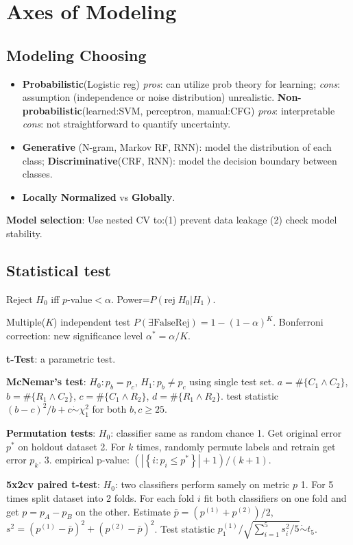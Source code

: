 \section{Axes of Modeling}

\subsection*{Modeling Choosing}

\begin{itemize}[itemsep=0pt,topsep=0pt, leftmargin=2pt, itemindent=5pt, labelwidth=5pt]
    \item \textbf{Probabilistic}(Logistic reg) \textit{pros}: can utilize prob theory for learning; \textit{cons}: assumption (independence or noise distribution) unrealistic. \textbf{Non-probabilistic}(learned:SVM, perceptron, manual:CFG) \textit{pros}: interpretable \textit{cons}: not straightforward to quantify uncertainty.
    \item \textbf{Generative} (N-gram, Markov RF, RNN): model the distribution of each class; \textbf{Discriminative}(CRF, RNN): model the decision boundary between classes.
    \item \textbf{Locally Normalized} vs \textbf{Globally}.
\end{itemize}





\textbf{Model selection}: Use nested CV to:(1) prevent data leakage (2) check model stability.

\subsection*{Statistical test} Reject $H_{0}$ iff $p$-value$<\alpha$. Power=$P(\mathrm{rej}\;H_0|H_1)$. 

Multiple($K$) independent test $P(\exists\mathrm{FalseRej})=1-(1-\alpha)^K$. Bonferroni correction: new significance level $\alpha^{*}=\alpha / K$.

\textbf{t-Test}: a parametric test.

\textbf{McNemar’s test}: $H_{0}: p_{b}=p_{c}$, $H_{1}: p_{b}\neq p_{c}$ using single test set. $a=\#\{C_1\land C_2\}$, $b=\#\{R_1\land C_2\}$, $c=\#\{C_1\land R_2\}$, $d=\#\{R_1\land R_2\}$. test statistic ${(b-c)^{2}}/{b+c} \dot{\sim} \chi_{1}^{2}$ for both $b,c\geq 25$.

\textbf{Permutation tests}: $H_{0}$: classifier same as random chance 1. Get original error $p^*$ on holdout dataset 2. For $k$ times, randomly permute labels and retrain get error $p_k$. 3. empirical p-value: $({\left|\left\{i: p_{i} \leq p^{*}\right\}\right|+1}) / ({k+1})$.

\textbf{5x2cv paired t-test}: $H_{0}$: two classifiers perform samely on metric $p$ 1. For 5 times split dataset into 2 folds. For each fold $i$ fit both classifiers on one fold and get $p=p_{A}-p_{B}$ on the other. Estimate $\bar{p}=(p^{(1)}+p^{(2)})/2$,$s^{2}=(p^{(1)}-\bar{p})^{2}+(p^{(2)}-\bar{p})^{2}$. Test statistic ${p_{1}^{(1)}}/{\sqrt{\sum_{i=1}^{5} s_{i}^{2}/5}} \dot{\sim} t_{5}$.
